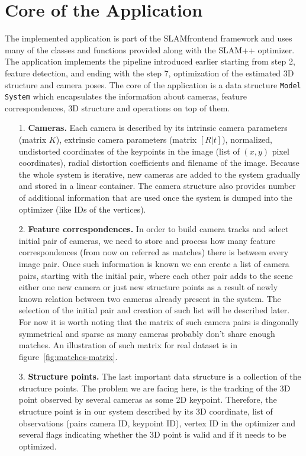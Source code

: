 \section{Core of the Application}
\label{sec:implementation-core}
The implemented application is part of the SLAM\textunderscore frontend framework and uses many of the classes and functions provided along with the SLAM++ optimizer. The application implements the pipeline introduced earlier starting from step 2, feature detection, and ending with the step 7, optimization of the estimated 3D structure and camera poses. The core of the application is a data structure \texttt{Model System} which encapsulates the information about cameras, feature correspondences, 3D structure and operations on top of them. 
\begin{itemize}
	\item[1.] \textbf{Cameras.} Each camera is described by its intrinsic camera parameters (matrix $K$), extrinsic camera parameters (matrix $[R|t]$), normalized, undistorted coordinates of the keypoints in the image (list of $(x, y)$ pixel coordinates), radial distortion coefficients and filename of the image. Because the whole system is iterative, new cameras are added to the system gradually and stored in a linear container. The camera structure also provides number of additional information that are used once the system is dumped into the optimizer (like IDs of the vertices).
	\item[2.] \textbf{Feature correspondences.} In order to build camera tracks and select initial pair of cameras, we need to store and process how many feature correspondences (from now on referred as matches) there is between every image pair. Once such information is known we can create a list of camera pairs, starting with the initial pair, where each other pair adds to the scene either one new camera or just new structure points as a result of newly known relation between two cameras already present in the system. The selection of the initial pair and creation of such list will be described later. For now it is worth noting that the matrix of such camera pairs is diagonally symmetrical and sparse as many cameras probably don't share enough matches. An illustration of such matrix for real dataset is in figure~\ref{fig:matches-matrix}.
	\item[3.] \textbf{Structure points.} The last important data structure is a collection of the structure points. The problem we are facing here, is the tracking of the 3D point observed by several cameras as some 2D keypoint. Therefore, the structure point is in our system described by its 3D coordinate, list of observations (pairs camera ID, keypoint ID), vertex ID in the optimizer and several flags indicating whether the 3D point is valid and if it needs to be optimized.
\end{itemize}

